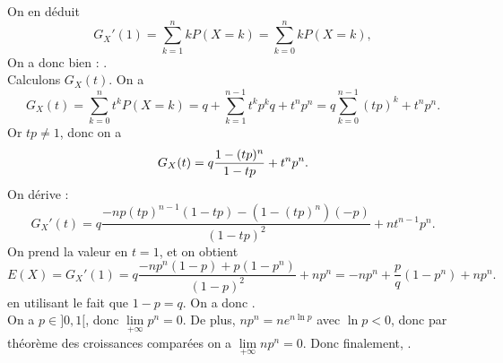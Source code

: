 \documentclass[a4paper, 11pt,reqno]{article}
\begin{document}
\begin{correction}
\begin{enumerate}
\begin{enumerate}
			            On en d\'eduit
			            $$G_X'(1) =  \sum\limits_{k=1}^n k  P(X=k) =  \sum\limits_{k=0}^n k  P(X=k),$$
			            On a donc bien : .\\
			            Calculons $G_X(t)$. On a
			            $$G_X(t)   =  \sum\limits_{k=0}^n t^k P(X=k) = q + \sum\limits_{k=1}^{n-1} t^k p^k q + t^n p^n = q \sum\limits_{k=0}^{n-1} (tp)^k  + t^n p^n.$$
			            Or $tp \not=1$, donc on a
			            $$G_X(t)  = \displaystyle q \frac{1-(tp)^n}{1-tp} + t^n p^n.$$
			            On d\'erive :\vsec
			            $$G_X'(t) = q \frac{-n p (tp)^{n-1} (1-tp) - (1-(tp)^n)(-p)}{(1-tp)^2} + nt^{n-1}p^n.$$
			            On prend la valeur en $t=1$, et on obtient
			            $$E(X) = G_X'(1) = q \frac{-n p^n(1-p) + p (1-p^n)}{(1-p)^2} + n p^n = -np^n + \frac{p}{q}(1-p^n) + n p^n.$$
			            en utilisant le fait que $1-p=q$. On a donc .\\
			            On a $p \in\rbrack 0,1\lbrack$, donc $\lim\limits_{+\infty}p^n =0$. De plus, $np^n = n e^{n \ln p}$ avec $\ln p <0$, donc par th\'eor\`eme des croissances compar\'ees on a $\lim\limits_{+\infty} np^n =0$. Donc finalement, .
		      \end{enumerate}
	\end{enumerate}
\end{correction}
















\end{document}
